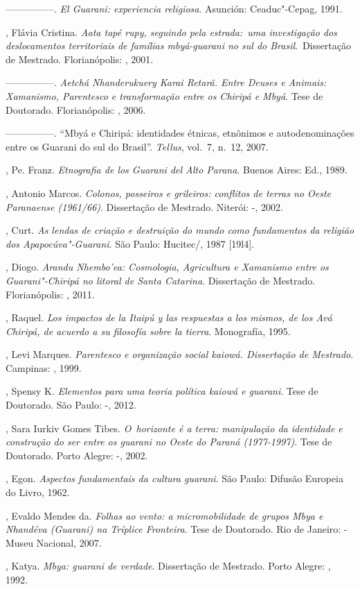 \begin{Parskip}
—————. \emph{El Guarani: experiencia religiosa}. Asunción: Ceaduc"-Cepag, 1991.

, Flávia Cristina. \emph{Aata tapé rupy, seguindo pela estrada:~uma
investigação dos deslocamentos territoriais de famílias mbyá-guarani no
sul do Brasil}.~Dissertação de Mestrado. Florianópolis: , 2001.

—————. \emph{Aetchá Nhanderukuery Karai Retarã. Entre Deuses e Animais:
Xamanismo, Parentesco e transformação entre os Chiripá e Mbyá}. Tese de
Doutorado. Florianópolis: , 2006. 

—————. ``Mbyá e Chiripá: identidades étnicas, etnônimos e autodenominações
entre os Guarani do sul do Brasil''. \emph{Tellus}, vol.~7, n.~12, 2007.

, Pe. Franz. \emph{Etnografia de los Guarani del Alto Parana}. Buenos
Aires:  Ed., 1989.

, Antonio Marcos. \emph{Colonos, posseiros e grileiros: conflitos de
terras no Oeste Paranaense (1961/66)}. Dissertação de Mestrado. Niterói:
-, 2002.

, Curt. \emph{As lendas de criação e destruição do mundo como
fundamentos da religião dos Apapocúva"-Guarani}. São Paulo: Hucitec/,
1987 [19l4].

, Diogo. \emph{Arandu Nhembo’ea: Cosmologia, Agricultura e Xamanismo
entre os Guarani"-Chiripá no litoral de Santa Catarina}. Dissertação de
Mestrado. Florianópolis: , 2011.

, Raquel. \emph{Los impactos de la Itaipú y las respuestas a los
mismos, de los Avá Chiripá, de acuerdo a su filosofía sobre la tierra}.
Monografía, 1995.

, Levi Marques. \emph{Parentesco e organização social kaiowá.
Dissertação de Mestrado}. Campinas: , 1999.

, Spensy K. \emph{Elementos para uma teoria política kaiowá e guarani}.
 Tese de Doutorado. São Paulo: -, 2012.

, Sara Iurkiv Gomes Tibes. \emph{O~horizonte é a terra: manipulação da
identidade e construção do ser entre os guarani no Oeste do Paraná
(1977-1997)}. Tese de Doutorado. Porto Alegre: -, 2002.

, Egon. \emph{Aspectos fundamentais da cultura guarani}. São Paulo:
Difusão Europeia do Livro, 1962.

, Evaldo Mendes da. \emph{Folhas ao vento: a micromobilidade de grupos
Mbya e Nhandéva (Guarani) na Tríplice Fronteira}. Tese de Doutorado. Rio
de Janeiro: -Museu Nacional, 2007.

, Katya. \emph{Mbya: guarani de verdade}. Dissertação de Mestrado. Porto
Alegre: , 1992.
\end{Parskip}


